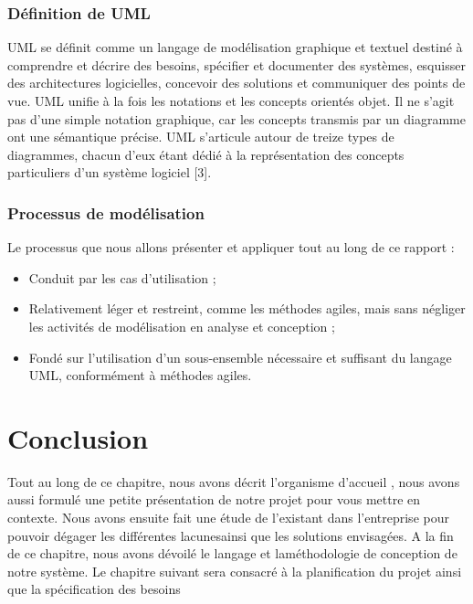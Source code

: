 \subsubsection{Définition de UML}
UML se définit comme un langage de modélisation graphique et textuel destiné à comprendre et décrire des besoins, spécifier et documenter des systèmes, esquisser des architectures
logicielles, concevoir des solutions et communiquer des points de vue. UML unifie à la fois les
notations et les concepts orientés objet. Il ne s’agit pas d’une simple notation graphique, car
les concepts transmis par un diagramme ont une sémantique précise.
UML s’articule autour de treize types de diagrammes, chacun d’eux étant dédié à la représentation des concepts particuliers d’un système logiciel [3].


\subsubsection{Processus de modélisation}
Le processus que nous allons présenter et appliquer tout au long de ce rapport :

\begin{itemize}
	\item Conduit par les cas d’utilisation ;
	\item Relativement léger et restreint, comme les méthodes agiles, mais sans négliger les activités
	de modélisation en analyse et conception ;
	\item Fondé sur l’utilisation d’un sous-ensemble nécessaire et suffisant du langage UML, conformément à méthodes agiles.
\end{itemize}



\section{Conclusion}

Tout au long de ce chapitre, nous avons décrit l’organisme d’accueil , nous avons aussi
formulé une petite présentation de notre projet pour vous mettre en contexte. Nous avons
ensuite fait une étude de l’existant dans l’entreprise pour pouvoir dégager les différentes lacunesainsi que les solutions envisagées. A la fin de ce chapitre, nous avons dévoilé le langage et laméthodologie de conception de notre système.
Le chapitre suivant sera consacré à la planification du projet ainsi que la spécification des
besoins
